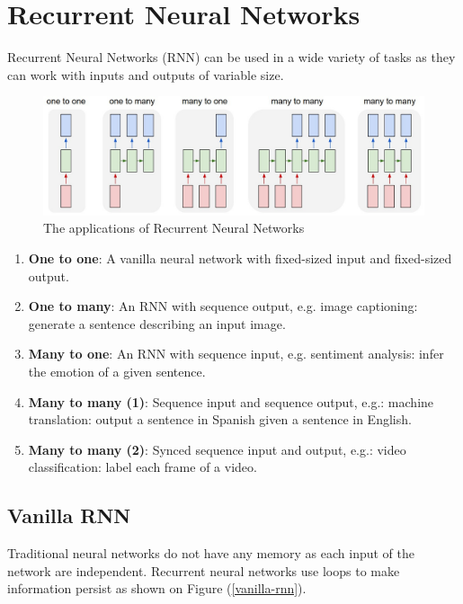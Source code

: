 \chapter{Recurrent Neural Networks}

Recurrent Neural Networks (RNN) can be used in a wide variety of tasks as they can work with inputs and outputs of variable size.
\begin{figure}[H]
    \centering
    \includegraphics[width=\textwidth]{Images/rnn.jpeg}
    \caption{The applications of Recurrent Neural Networks \cite{unres-rnn}}
\end{figure}

\begin{enumerate}
     \itemsep0em
     \item \textbf{One to one}: A vanilla neural network with fixed-sized input and fixed-sized output.
     \item \textbf{One to many}: An RNN with sequence output, e.g. image captioning: generate a sentence describing an input image.
     \item \textbf{Many to one}: An RNN with sequence input, e.g. sentiment analysis: infer the emotion of a given sentence.
     \item \textbf{Many to many (1)}: Sequence input and sequence output, e.g.: machine translation: output a sentence in Spanish given a sentence in English.
     \item \textbf{Many to many (2)}: Synced sequence input and output, e.g.: video classification: label each frame of a video.
\end{enumerate}

\section{Vanilla RNN}
Traditional neural networks do not have any memory as each input of the network are independent. Recurrent neural networks use loops to make information persist as shown on Figure (\ref{vanilla-rnn}).

